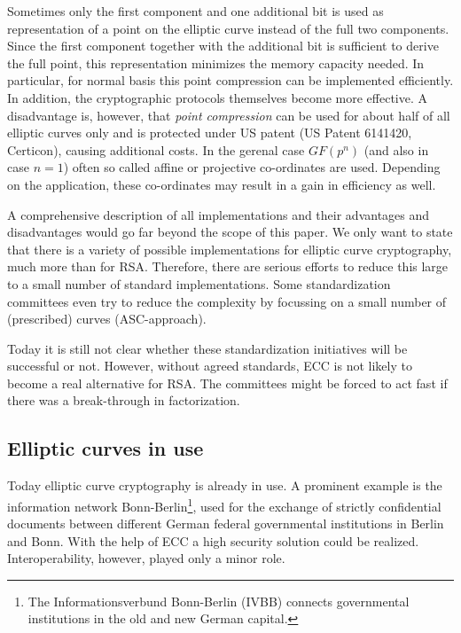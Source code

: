 Sometimes only the first component and one additional bit is used as representation of a point on the elliptic curve instead of the full two components. Since the first component together with the additional bit is sufficient to derive the full point, this representation minimizes the memory capacity needed. In particular, for normal basis this point compression can be implemented efficiently. In addition, the cryptographic protocols themselves become more effective. A disadvantage is, however, that {\it point compression} can be used for about half of all elliptic curves only and is protected under
US patent (US Patent 6141420, Certicon), causing additional costs.
In the gerenal case $GF(p^n)$ (and also in case $n=1$) often so called affine or projective co-ordinates are used. Depending on the application, these co-ordinates may result in a gain in efficiency as well.

A comprehensive description of all implementations and their advantages and disadvantages would go far beyond the scope of this paper. We only want to state that there is a variety of possible implementations for elliptic curve cryptography, much more than for RSA. Therefore, there are serious efforts to reduce this large to a small number of standard implementations. Some standardization committees even try to reduce the complexity by focussing on a small number of (prescribed) curves (ASC-approach).

Today it is still not clear whether these standardization initiatives will be
successful or not. However, without agreed standards, ECC is not likely to
become a real alternative for RSA. The committees might be forced to act fast
if there was a break-through in factorization.


\subsection{Elliptic curves in use}

Today elliptic curve cryptography is already in use. A prominent example is the information network Bonn-Berlin\footnote{The Informationsverbund Bonn-Berlin (IVBB) connects governmental institutions in the old and new German capital.}, used for the exchange of strictly confidential documents between different German federal governmental institutions in Berlin and Bonn. With the help of ECC a high security solution could be realized. Interoperability, however, played only a minor role.

